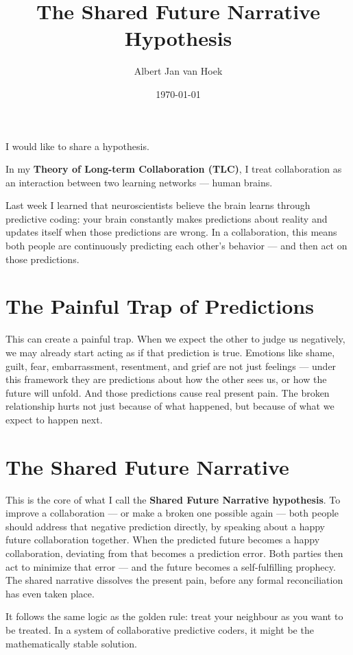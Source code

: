 \documentclass{article}
\title{The Shared Future Narrative Hypothesis}
\author{Albert Jan van Hoek}
\date{\today}
\begin{document}
\maketitle

I would like to share a hypothesis.

In my \textbf{Theory of Long-term Collaboration (TLC)}, I treat collaboration as an interaction between two learning networks — human brains.

Last week I learned that neuroscientists believe the brain learns through predictive coding: your brain constantly makes predictions about reality and updates itself when those predictions are wrong. In a collaboration, this means both people are continuously predicting each other's behavior — and then act on those predictions.

\section*{The Painful Trap of Predictions}

This can create a painful trap. When we expect the other to judge us negatively, we may already start acting as if that prediction is true. Emotions like shame, guilt, fear, embarrassment, resentment, and grief are not just feelings — under this framework they are predictions about how the other sees us, or how the future will unfold. And those predictions cause real present pain. The broken relationship hurts not just because of what happened, but because of what we expect to happen next.

\section*{The Shared Future Narrative}

This is the core of what I call the \textbf{Shared Future Narrative hypothesis}. To improve a collaboration — or make a broken one possible again — both people should address that negative prediction directly, by speaking about a happy future collaboration together. When the predicted future becomes a happy collaboration, deviating from that becomes a prediction error. Both parties then act to minimize that error — and the future becomes a self-fulfilling prophecy. The shared narrative dissolves the present pain, before any formal reconciliation has even taken place.

It follows the same logic as the golden rule: treat your neighbour as you want to be treated. In a system of collaborative predictive coders, it might be the mathematically stable solution.
\end{document}
